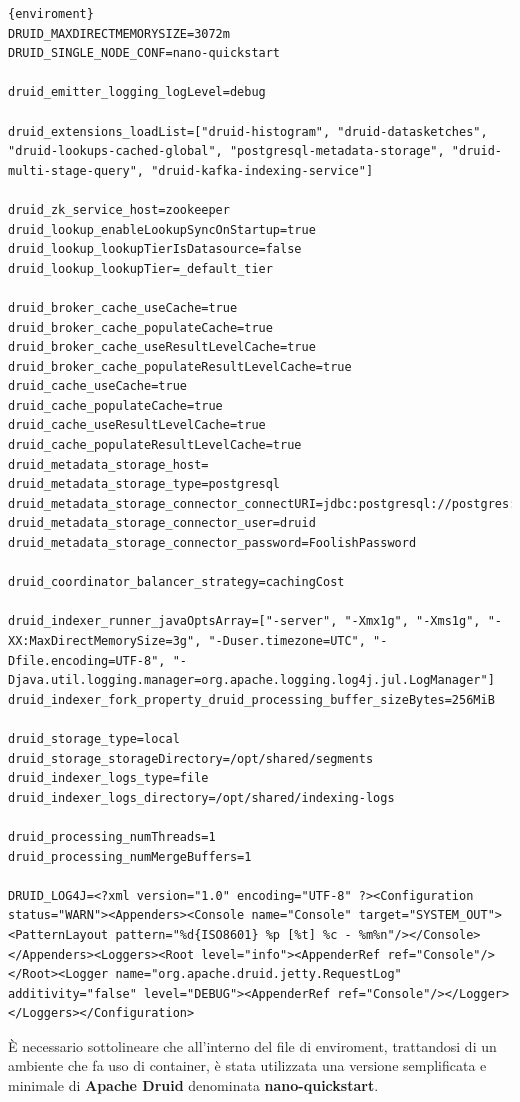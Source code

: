 \begin{lstlisting}[caption=\texttt{enviroment}, label=lst:file1]{enviroment}
DRUID_MAXDIRECTMEMORYSIZE=3072m
DRUID_SINGLE_NODE_CONF=nano-quickstart

druid_emitter_logging_logLevel=debug

druid_extensions_loadList=["druid-histogram", "druid-datasketches", "druid-lookups-cached-global", "postgresql-metadata-storage", "druid-multi-stage-query", "druid-kafka-indexing-service"]

druid_zk_service_host=zookeeper
druid_lookup_enableLookupSyncOnStartup=true
druid_lookup_lookupTierIsDatasource=false
druid_lookup_lookupTier=_default_tier

druid_broker_cache_useCache=true
druid_broker_cache_populateCache=true
druid_broker_cache_useResultLevelCache=true
druid_broker_cache_populateResultLevelCache=true
druid_cache_useCache=true
druid_cache_populateCache=true
druid_cache_useResultLevelCache=true
druid_cache_populateResultLevelCache=true
druid_metadata_storage_host=
druid_metadata_storage_type=postgresql
druid_metadata_storage_connector_connectURI=jdbc:postgresql://postgres:5432/druid
druid_metadata_storage_connector_user=druid
druid_metadata_storage_connector_password=FoolishPassword

druid_coordinator_balancer_strategy=cachingCost

druid_indexer_runner_javaOptsArray=["-server", "-Xmx1g", "-Xms1g", "-XX:MaxDirectMemorySize=3g", "-Duser.timezone=UTC", "-Dfile.encoding=UTF-8", "-Djava.util.logging.manager=org.apache.logging.log4j.jul.LogManager"]
druid_indexer_fork_property_druid_processing_buffer_sizeBytes=256MiB

druid_storage_type=local
druid_storage_storageDirectory=/opt/shared/segments
druid_indexer_logs_type=file
druid_indexer_logs_directory=/opt/shared/indexing-logs

druid_processing_numThreads=1
druid_processing_numMergeBuffers=1

DRUID_LOG4J=<?xml version="1.0" encoding="UTF-8" ?><Configuration status="WARN"><Appenders><Console name="Console" target="SYSTEM_OUT"><PatternLayout pattern="%d{ISO8601} %p [%t] %c - %m%n"/></Console></Appenders><Loggers><Root level="info"><AppenderRef ref="Console"/></Root><Logger name="org.apache.druid.jetty.RequestLog" additivity="false" level="DEBUG"><AppenderRef ref="Console"/></Logger></Loggers></Configuration>

\end{lstlisting}
È necessario sottolineare che all'interno del file di enviroment, trattandosi di un ambiente che fa uso di \gls{container}{}, 
è stata utilizzata una versione semplificata e minimale di \textbf{Apache Druid} denominata \textbf{nano-quickstart}.

